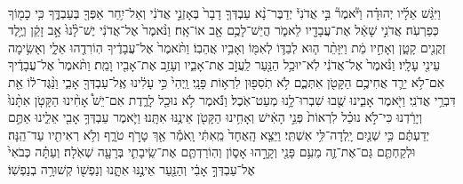 \documentclass[twoside, openany, parskip=half, 11pt]{book}
\begin{document}
\begin{footnotesize}
\begin{multicols}{2}
\\
 וַיִּגַּ֨שׁ אֵלָ֜יו יְהוּדָ֗ה וַיֹּ֘אמֶר֘ בִּ֣י אֲדֹנִי֒ יְדַבֶּר־נָ֨א עַבְדְּךָ֤ דָבָר֙ בְּאָזְנֵ֣י אֲדֹנִ֔י וְאַל־יִ֥חַר אַפְּךָ֖ בְּעַבְדֶּ֑ךָ כִּ֥י כָמ֖וֹךָ כְּפַרְעֹֽה׃ אֲדֹנִ֣י שָׁאַ֔ל אֶת־עֲבָדָ֖יו לֵאמֹ֑ר הֲיֵשׁ־לָכֶ֥ם אָ֖ב אוֹ־אָֽח׃ וַנֹּ֨אמֶר֙ אֶל־אֲדֹנִ֔י יֶשׁ־לָ֨נוּ֙ אָ֣ב זָקֵ֔ן וְיֶ֥לֶד זְקֻנִ֖ים קָטָ֑ן וְאָחִ֣יו מֵ֔ת וַיִּוָּתֵ֨ר ה֧וּא לְבַדּ֛וֹ לְאִמּ֖וֹ וְאָבִ֥יו אֲהֵבֽוֹ׃  וַתֹּ֨אמֶר֙ אֶל־עֲבָדֶ֔יךָ הֽוֹרִדֻ֖הוּ אֵלָ֑י וְאָשִׂ֥ימָה עֵינִ֖י עָלָֽיו׃ וַנֹּ֨אמֶר֙ אֶל־אֲדֹנִ֔י לֹֽא־יוּכַ֥ל הַנַּ֖עַר לַֽעֲזֹ֣ב אֶת־אָבִ֑יו וְעָזַ֥ב אֶת־אָבִ֖יו וָמֵֽת׃ וַתֹּ֨אמֶר֙ אֶל־עֲבָדֶ֔יךָ אִם־לֹ֥א יֵרֵ֛ד אֲחִיכֶ֥ם הַקָּטֹ֖ן אִתְּכֶ֑ם לֹ֥א תֹֽסִפ֖וּן לִרְא֥וֹת פָּנָֽי׃ וַֽיְהִי֙ כִּ֣י עָלִ֔ינוּ אֶֽל־עַבְדְּךָ֖ אָבִ֑י וַנַּ֨גֶּד־ל֔וֹ אֵ֖ת דִּבְרֵ֥י אֲדֹנִֽי׃  וַיֹּ֖אמֶר אָבִ֑ינוּ שֻׁ֖בוּ שִׁבְרוּ־לָ֥נוּ מְעַט־אֹֽכֶל׃ וַנֹּ֕אמֶר לֹ֥א נוּכַ֖ל לָרֶ֑דֶת אִם־יֵשׁ֩ אָחִ֨ינוּ הַקָּטֹ֤ן אִתָּ֨נוּ֙ וְיָרַ֔דְנוּ כִּי־לֹ֣א נוּכַ֗ל לִרְאוֹת֙ פְּנֵ֣י הָאִ֔ישׁ וְאָחִ֥ינוּ הַקָּטֹ֖ן אֵינֶ֥נּוּ אִתָּֽנוּ׃ וַיֹּ֛אמֶר עַבְדְּךָ֥ אָבִ֖י אֵלֵ֑ינוּ אַתֶּ֣ם יְדַעְתֶּ֔ם כִּ֥י שְׁנַ֖יִם יָֽלְדָה־לִּ֥י אִשְׁתִּֽי׃ וַיֵּצֵ֤א הָֽאֶחָד֙ מֵֽאִתִּ֔י וָֽאֹמַ֕ר אַ֖ךְ טָרֹ֣ף טֹרָ֑ף וְלֹ֥א רְאִיתִ֖יו עַד־הֵֽנָּה׃ וּלְקַחְתֶּ֧ם גַּם־אֶת־זֶ֛ה מֵעִ֥ם פָּנַ֖י וְקָרָ֣הוּ אָס֑וֹן וְהֽוֹרַדְתֶּ֧ם אֶת־שֵֽׂיבָתִ֛י בְּרָעָ֖ה שְׁאֹֽלָה׃ וְעַתָּ֗ה כְּבֹאִי֙ אֶל־עַבְדְּךָ֣ אָבִ֔י וְהַנַּ֖עַר אֵינֶ֣נּוּ אִתָּ֑נוּ וְנַפְשׁ֖וֹ קְשׁוּרָ֥ה בְנַפְשֽׁוֹ׃


\end{multicols}
\end{footnotesize}
\end{document}
